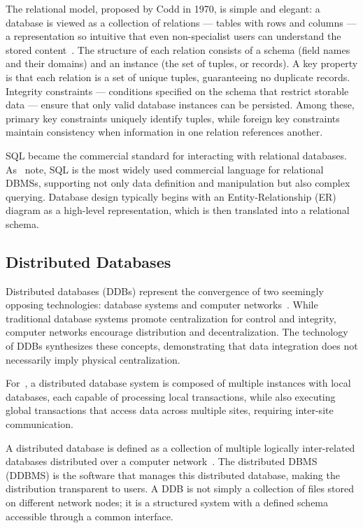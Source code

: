 The relational model, proposed by Codd in 1970, is simple and elegant: a database is viewed
as a collection of relations --- tables with rows and columns --- a representation so intuitive
that even non-specialist users can understand the stored content~\cite{Ramakrishnan2003}.
The structure of each relation consists of a schema (field names and their domains) and an
instance (the set of tuples, or records). A key property is that each relation is a set of
unique tuples, guaranteeing no duplicate records. Integrity constraints --- conditions specified
on the schema that restrict storable data --- ensure that only valid database instances can
be persisted. Among these, primary key constraints uniquely identify tuples, while foreign key
constraints maintain consistency when information in one relation references another.

SQL became the commercial standard for interacting with relational databases.
As~\cite{Ramakrishnan2003} note, SQL is the most widely used commercial language for
relational DBMSs, supporting not only data definition and manipulation but also complex
querying. Database design typically begins with an Entity-Relationship (ER) diagram as a
high-level representation, which is then translated into a relational schema.

\subsection{Distributed Databases}

Distributed databases (DDBs) represent the convergence of two seemingly opposing technologies:
database systems and computer networks~\cite{Ozsu2011}. While traditional database systems
promote centralization for control and integrity, computer networks encourage distribution and
decentralization. The technology of DDBs synthesizes these concepts, demonstrating that data
integration does not necessarily imply physical centralization.

For~\cite{Silberschatz2020}, a distributed database system is composed of multiple instances
with local databases, each capable of processing local transactions, while also executing
global transactions that access data across multiple sites, requiring inter-site communication.

A distributed database is defined as a collection of multiple logically inter-related databases
distributed over a computer network~\cite{Ozsu2011}. The distributed DBMS (DDBMS) is the
software that manages this distributed database, making the distribution transparent to users.
A DDB is not simply a collection of files stored on different network nodes; it is a structured
system with a defined schema accessible through a common interface.

